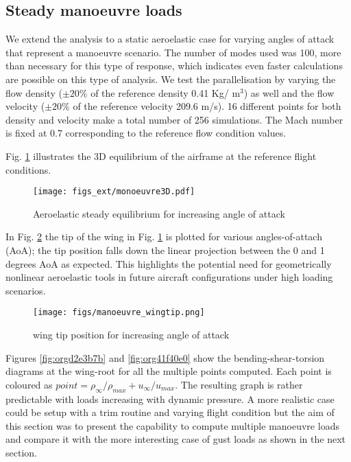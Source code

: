 \documentclass[11pt]{article}
\begin{document}
\subsection{Steady manoeuvre loads}
\label{sec:org1c8afec}
We extend the analysis to a static aeroelastic case for varying angles of attack that represent a manoeuvre scenario. The number of modes used was 100, more than necessary for this type of response, which indicates even faster calculations are possible on this type of analysis. We test the parallelisation by varying the flow density (\(\pm 20 \%\) of the reference density 0.41 Kg/ m\(^3\)) as well and the flow velocity (\(\pm 20 \%\) of the reference velocity 209.6 m/s). 16 different points for both density and velocity make a total number of 256 simulations. The Mach number is fixed at 0.7 corresponding to the reference flow condition values.

Fig. \ref{fig:orgc023faf} illustrates the 3D equilibrium of the airframe at the reference flight conditions. 

\begin{figure}[htbp]
\centering
\texttt{[image: figs\_ext/monoeuvre3D.pdf]}
\caption{\label{fig:orgc023faf}Aeroelastic steady equilibrium for increasing angle of attack}
\end{figure}

In Fig. \ref{fig:org2aa5960} the tip of the wing in Fig. \ref{fig:orgc023faf} is plotted for various angles-of-attach (AoA); the tip position falls down the linear projection between the 0 and 1 degrees AoA as expected. This highlights the potential need for geometrically nonlinear aeroelastic tools in future aircraft configurations under high loading scenarios. 

\begin{figure}[htbp]
\centering
\texttt{[image: figs/manoeuvre\_wingtip.png]}
\caption{\label{fig:org2aa5960}wing tip position for increasing angle of attack}
\end{figure}

Figures \ref{fig:orgd2e3b7b} and \ref{fig:org41f40e0} show the bending-shear-torsion diagrams at the wing-root for all the multiple points computed. Each point is coloured as \(point = \rho_{\infty} / \rho_{max} + u_{\infty} / u_{max}\). The resulting graph is rather predictable with loads increasing with dynamic pressure. A more realistic case could be setup with a trim routine and varying flight condition but the aim of this section was to present the capability to compute multiple manoeuvre loads and compare it with the more interesting case of gust loads as shown in the next section.
\end{document}
